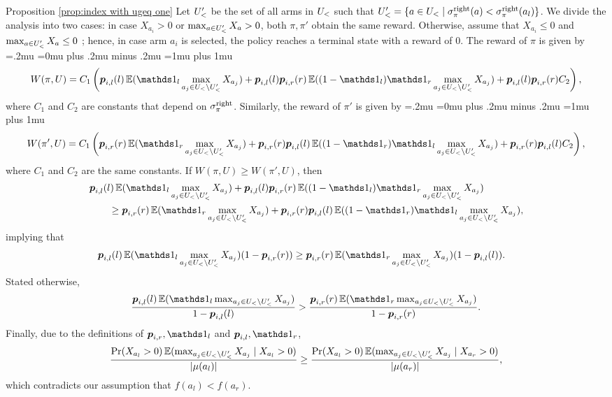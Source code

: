 \begin{proofof}{Proposition \ref{prop:index with ugeq one}}
Let $U_<'$ be the set of all arms in $U_<$ such that $U_<'=\{a\in U_<\mid \sigma^{\textnormal{right}}_\pi(a)< \sigma^{\textnormal{right}}_\pi(a_{l})  \}$. We divide the analysis into two cases: in case $X_{a_{i}} >0$ or $\max_{a\in U_<'} X_a > 0$, both $\pi,\pi'$ obtain the same reward. Otherwise, assume that $X_{a_{i}} \leq 0$ and $\max_{a\in U_<'} X_a \leq 0$ ; hence, in case arm $a_{i}$ is selected, the policy reaches a terminal state with a reward of 0. The reward of $\pi$ is given by 
{\small
\thinmuskip=.2mu
\medmuskip=0mu plus .2mu minus .2mu
\thickmuskip=1mu plus 1mu
\begin{align*}
W(\pi,U)=C_1 \left( \bl p_{i,l}(l)\E(\ind_l \max_{a_j \in {U_< \setminus \ul'}} X_{a_j} )+\bl p_{i,l}(l)\bl p_{i,r}(r)\E((1-\ind_l)\ind_r \max_{a_j \in {U_< \setminus \ul'}} X_{a_j})+\bl p_{i,l}(l)\bl p_{i,r}(r)C_2 \right),
\end{align*}}%
where $C_1$ and $C_2$ are constants that depend on $\sigma^{\textnormal{right}}_\pi$. Similarly, the reward of $\pi'$ is given by 
{\small
\thinmuskip=.2mu
\medmuskip=0mu plus .2mu minus .2mu
\thickmuskip=1mu plus 1mu
\begin{align*}
W(\pi',U) = C_1\left( \bl p_{i,r}(r)\E(\ind_r \max_{a_j \in {U_< \setminus \ul'}} X_{a_j} )+\bl p_{i,r}(r)\bl p_{i,l}(l)\E((1-\ind_r)\ind_l \max_{a_j \in {U_< \setminus \ul'}} X_{a_j})+\bl p_{i,r}(r)\bl p_{i,l}(l)C_2 \right),
\end{align*}}%
where $C_1$ and $C_2$ are the same constants.
If $W(\pi,U)\geq W(\pi',U)$, then
\begin{align*}
& \bl p_{i,l}(l)\E(\ind_l \max_{a_j \in {U_< \setminus \ul'}} X_{a_j} )+\bl p_{i,l}(l)\bl p_{i,r}(r)\E((1-\ind_l)\ind_r \max_{a_j \in {U_< \setminus \ul'}} X_{a_j}) \\
&\qquad \geq \bl p_{i,r}(r)\E(\ind_r \max_{a_j \in {U_< \setminus \ul'}} X_{a_j} )+\bl p_{i,r}(r)\bl p_{i,l}(l)\E((1-\ind_r)\ind_l \max_{a_j \in {U_< \setminus \ul'}} X_{a_j}),
\end{align*}
implying that
\begin{align*}
&\bl p_{i,l}(l)\E(\ind_l \max_{a_j \in  {U_< \setminus \ul'}} X_{a_j} )(1-\bl p_{i,r}(r)) \geq \bl p_{i,r}(r)\E(\ind_r \max_{a_j \in  {U_< \setminus \ul'}} X_{a_j} )(1-\bl p_{i,l}(l)).
\end{align*}
Stated otherwise,
\begin{align*}
\frac{\bl p_{i,l}(l)\E(\ind_l \max_{a_j \in {U_< \setminus \ul'}} X_{a_j} )}{ 1-\bl p_{i,l}(l)} > \frac{\bl p_{i,r}(r)\E(\ind_r \max_{a_j \in {U_< \setminus \ul'}} X_{a_j} )}{1-\bl p_{i,r}(r) }.
\end{align*}
Finally, due to the definitions of $\bl p_{i,r},\ind_l$ and $\bl p_{i,l}, \ind_r$,
\begin{align*}
\frac{\Pr(X_{a_l} > 0 )\operatorname{\mathbb{E}}(\max_{a_j \in {U_< \setminus U_<'} } X_{a_j}\mid X_{a_l}>0 )}{\left| \mu(a_l) \right|} \geq \frac{\Pr(X_{a_l} > 0 )\operatorname{\mathbb{E}}( \max_{a_j \in {U_< \setminus U_<'}} X_{a_j} \mid X_{a_r} >0 )}{\left| \mu(a_r) \right|},
\end{align*}
which contradicts our assumption that $f(a_{l})<f(a_{r})$.
\end{proofof}


